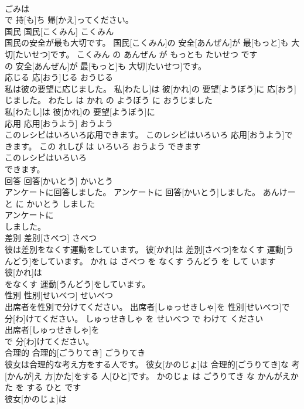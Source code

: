 \documentclass[8pt]{extreport}
\begin{document}
\begin{CJK}{UTF8}{min}
\\	ごみは
\\	で 持[も]ち 帰[かえ]ってください。			
\\	国民	国民[こくみん]	こくみん	
\\	国民の安全が最も大切です。	国民[こくみん]の 安全[あんぜん]が 最[もっと]も 大切[たいせつ]です。	こくみん の あんぜん が もっとも たいせつ です	
\\	の 安全[あんぜん]が 最[もっと]も 大切[たいせつ]です。			
\\	応じる	応[おう]じる	おうじる	
\\	私は彼の要望に応じました。	私[わたし]は 彼[かれ]の 要望[ようぼう]に 応[おう]じました。	わたし は かれ の ようぼう に おうじました	
\\	私[わたし]は 彼[かれ]の 要望[ようぼう]に
\\	応用	応用[おうよう]	おうよう	
\\	このレシピはいろいろ応用できます。	このレシピはいろいろ 応用[おうよう]できます。	この れしぴ は いろいろ おうよう できます	
\\	このレシピはいろいろ
\\	できます。			
\\	回答	回答[かいとう]	かいとう	
\\	アンケートに回答しました。	アンケートに 回答[かいとう]しました。	あんけーと に かいとう しました	
\\	アンケートに
\\	しました。			
\\	差別	差別[さべつ]	さべつ	
\\	彼は差別をなくす運動をしています。	彼[かれ]は 差別[さべつ]をなくす 運動[うんどう]をしています。	かれ は さべつ を なくす うんどう を して います	
\\	彼[かれ]は
\\	をなくす 運動[うんどう]をしています。			
\\	性別	性別[せいべつ]	せいべつ	
\\	出席者を性別で分けてください。	出席者[しゅっせきしゃ]を 性別[せいべつ]で 分[わ]けてください。	しゅっせきしゃ を せいべつ で わけて ください	
\\	出席者[しゅっせきしゃ]を
\\	で 分[わ]けてください。			
\\	合理的	合理的[ごうりてき]	ごうりてき	
\\	彼女は合理的な考え方をする人です。	彼女[かのじょ]は 合理的[ごうりてき]な 考[かんが]え 方[かた]をする 人[ひと]です。	かのじょ は ごうりてき な かんがえかた を する ひと です	
\\	彼女[かのじょ]は

\end{CJK}
\end{document}
